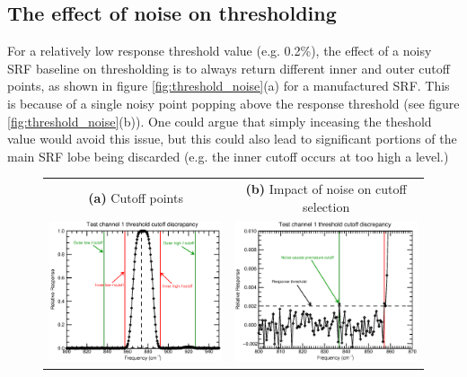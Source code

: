 \subsection{The effect of noise on thresholding}
For a relatively low response threshold value (e.g. 0.2\%), the effect of a noisy SRF baseline on thresholding is to always return different inner and outer cutoff points, as shown in figure \ref{fig:threshold_noise}(a) for a manufactured SRF. This is because of a single noisy point popping above the response threshold (see figure \ref{fig:threshold_noise}(b)). One could argue that simply inceasing the theshold value would avoid this issue, but this could also lead to significant portions of the main SRF lobe being discarded (e.g. the inner cutoff occurs at too high a level.)
\begin{figure}[H]
  \centering
  \begin{tabular}{c c}
    \textsf{\textbf{(a)} Cutoff points} &
    \textsf{\textbf{(b)} Impact of noise on cutoff selection} \\
    \includegraphics[bb= 0 15 400 300,clip,scale=0.6]{graphics/threshold_noise.eps} &
    \includegraphics[bb=15 15 400 300,clip,scale=0.6]{graphics/threshold_noise-zoom.eps} 

\end{tabular}
\end{figure}
